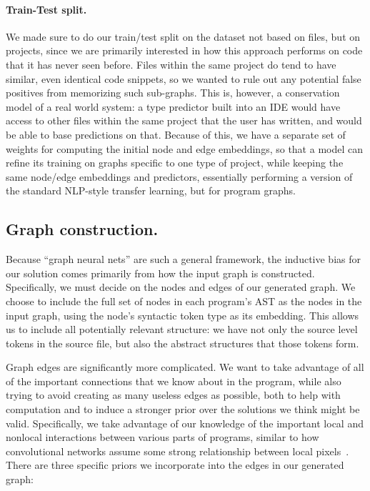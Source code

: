\paragraph{Train-Test split.}
We made sure to do our train/test split on the dataset not based on files, but on projects, since we are primarily interested in how this approach performs on code that it has never seen before.
Files within the same project do tend to have similar, even identical code snippets, so we wanted to rule out any potential false positives from memorizing such sub-graphs.
This is, however, a conservation model of a real world system: a type predictor built into an IDE would have access to other files within the same project that the user has written, and would be able to base predictions on that.
Because of this, we have a separate set of weights for computing the initial node and edge embeddings, so that a model can refine its training on graphs specific to one type of project, while keeping the same node/edge embeddings and predictors, essentially performing a version of the standard NLP-style transfer learning, but for program graphs.

\subsection{Graph construction.}
\label{sec:graph-neural-net}
Because ``graph neural nets'' are such a general framework, the inductive bias for our solution comes primarily from how the input graph is constructed.
Specifically, we must decide on the nodes and edges of our generated graph.
We choose to include the full set of nodes in each program's AST as the nodes in the input graph, using the node's syntactic token type as its embedding.
This allows us to include all potentially relevant structure: we have not only the source level tokens in the source file, but also the abstract structures that those tokens form.

Graph edges are significantly more complicated.
We want to take advantage of all of the important connections that we know about in the program, while also trying to avoid creating as many useless edges as possible, both to help with computation and to induce a stronger prior over the solutions we think might be valid.
Specifically, we take advantage of our knowledge of the important local and nonlocal interactions between various parts of programs, similar to how convolutional networks assume some strong relationship between local pixels~\cite{henaff2015deep}.
There are three specific priors we incorporate into the edges in our generated graph:

